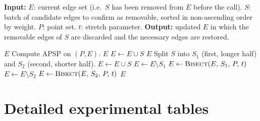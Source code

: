 \documentclass{cccg26}
\begin{document}
\begin{algorithm*}[h]
\caption{\textsc{Bisect}$(E,\,S,\,P,\,t)$}
\label{alg:bisect}
\begin{algorithmic}[1]
\Statex \textbf{Input:}
\Statex \hspace{1cm} $E$: current edge set (i.e.\ $S$ has been removed from $E$ before the call).
\Statex \hspace{1cm} $S$: batch of candidate edges to confirm as removable, sorted in non-ascending order by weight.
\Statex \hspace{1cm} $P$: point set.
\Statex \hspace{1cm} $t$: stretch parameter.
\Statex \textbf{Output:} updated $E$ in which the removable edges of $S$ are discarded and the necessary edges are restored.

    \State \Return $E$
\EndIf
\State Compute APSP on $(P,E)$.
    \State \Return $E$ 
\EndIf
{}
    \State $E \leftarrow E \cup S$ 
    \State \Return $E$
\EndIf
\State Split $S$ into $S_1$ (first, longer half) and $S_2$ (second, shorter half).
\State $E \leftarrow E \cup S$ 
\State $E \leftarrow E \setminus S_1$
\State $E \leftarrow \textsc{Bisect}(E,\, S_1,\, P,\, t)$
\State $E \leftarrow E \setminus S_2$
\State $E \leftarrow \textsc{Bisect}(E,\, S_2,\, P,\, t)$
\State \Return $E$
\end{algorithmic}
\end{algorithm*}


\section{Detailed experimental tables}
\label{app:tables}
\end{document}
